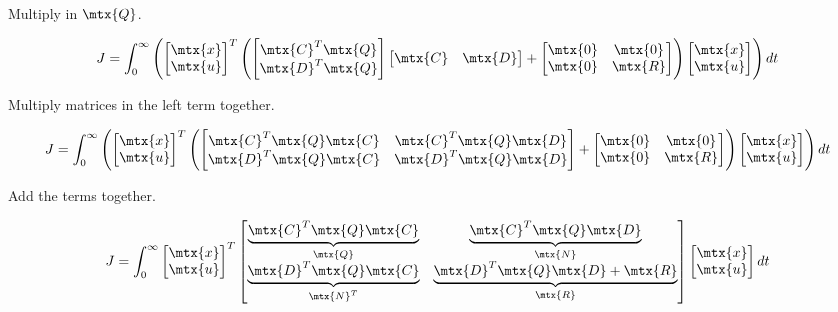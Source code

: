 Multiply in $\mtx{Q}$.

\begin{equation*}
  J = \int_0^\infty \left(
    \begin{bmatrix}
      \mtx{x} \\
      \mtx{u}
    \end{bmatrix}^T
    \left(
    \begin{bmatrix}
      \mtx{C}^T\mtx{Q} \\
      \mtx{D}^T\mtx{Q}
    \end{bmatrix}
    \begin{bmatrix}
      \mtx{C} &
      \mtx{D}
    \end{bmatrix} +
    \begin{bmatrix}
      \mtx{0} & \mtx{0} \\
      \mtx{0} & \mtx{R}
    \end{bmatrix}
    \right)
    \begin{bmatrix}
      \mtx{x} \\
      \mtx{u}
    \end{bmatrix}
    \right) dt
\end{equation*}

Multiply matrices in the left term together.

\begin{equation*}
  J = \int_0^\infty \left(
    \begin{bmatrix}
      \mtx{x} \\
      \mtx{u}
    \end{bmatrix}^T
    \left(
    \begin{bmatrix}
      \mtx{C}^T\mtx{Q}\mtx{C} & \mtx{C}^T\mtx{Q}\mtx{D} \\
      \mtx{D}^T\mtx{Q}\mtx{C} & \mtx{D}^T\mtx{Q}\mtx{D}
    \end{bmatrix} +
    \begin{bmatrix}
      \mtx{0} & \mtx{0} \\
      \mtx{0} & \mtx{R}
    \end{bmatrix}
    \right)
    \begin{bmatrix}
      \mtx{x} \\
      \mtx{u}
    \end{bmatrix}
    \right) dt
\end{equation*}

Add the terms together.

\begin{equation}
  J = \int_0^\infty
  \begin{bmatrix}
    \mtx{x} \\
    \mtx{u}
  \end{bmatrix}^T
  \begin{bmatrix}
    \underbrace{\mtx{C}^T\mtx{Q}\mtx{C}}_{\mtx{Q}} &
    \underbrace{\mtx{C}^T\mtx{Q}\mtx{D}}_{\mtx{N}} \\
    \underbrace{\mtx{D}^T\mtx{Q}\mtx{C}}_{\mtx{N}^T} &
    \underbrace{\mtx{D}^T\mtx{Q}\mtx{D} + \mtx{R}}_{\mtx{R}}
  \end{bmatrix}
  \begin{bmatrix}
    \mtx{x} \\
    \mtx{u}
  \end{bmatrix}
  dt
\end{equation}

